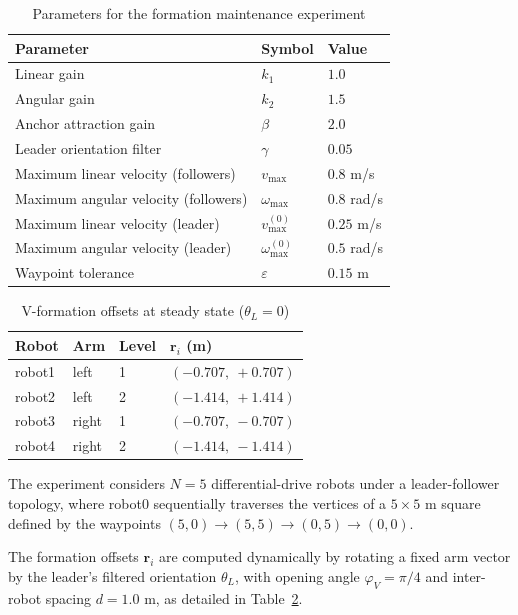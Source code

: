 \begin{table}[h]
\centering
\caption{Parameters for the formation maintenance experiment}
\label{tab:params_formation}
\begin{tabular}{lll}
\hline
\textbf{Parameter} & \textbf{Symbol} & \textbf{Value} \\
\hline
Linear gain & $k_1$ & $1.0$ \\
Angular gain & $k_2$ & $1.5$ \\
Anchor attraction gain & $\beta$ & $2.0$ \\
Leader orientation filter & $\gamma$ & $0.05$ \\
Maximum linear velocity (followers) & $v_{\max}$ & $0.8$ m/s \\
Maximum angular velocity (followers) & $\omega_{\max}$ & $0.8$ rad/s \\
Maximum linear velocity (leader) & $v_{\max}^{(0)}$ & $0.25$ m/s \\
Maximum angular velocity (leader) & $\omega_{\max}^{(0)}$ & $0.5$ rad/s \\
Waypoint tolerance & $\varepsilon$ & $0.15$ m \\
\hline
\end{tabular}
\end{table}

\begin{table}[h]
\centering
\caption{V-formation offsets at steady state ($\theta_L = 0$)}
\label{tab:offsets}
\begin{tabular}{llll}
\hline
\textbf{Robot} & \textbf{Arm} & \textbf{Level} & $\mathbf{r}_i$ (m) \\
\hline
robot1 & left  & 1 & $(-0.707,\ +0.707)$ \\
robot2 & left  & 2 & $(-1.414,\ +1.414)$ \\
robot3 & right & 1 & $(-0.707,\ -0.707)$ \\
robot4 & right & 2 & $(-1.414,\ -1.414)$ \\
\hline
\end{tabular}
\end{table}

The experiment considers $N = 5$ differential-drive robots under a leader-follower topology, where robot0 sequentially traverses the vertices of a $5 \times 5$ m square defined by the waypoints $(5,0) \to (5,5) \to (0,5) \to (0,0)$.

The formation offsets $\mathbf{r}_i$ are computed dynamically by rotating a fixed arm vector by the leader's filtered orientation $\theta_L$, with opening angle $\varphi_V = \pi/4$ and inter-robot spacing $d = 1.0$ m, as detailed in Table~\ref{tab:offsets}. 

